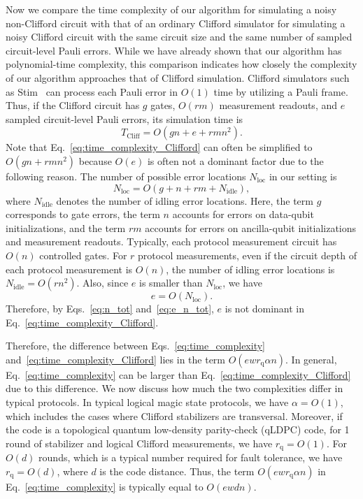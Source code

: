 \documentclass[
 reprint,
 amsmath,amssymb,
 pra,superscriptaddress, nofootinbib
]{revtex4-2}
\theoremstyle{definition}
\theoremstyle{plain}
\begin{document}
Now we compare the time complexity of our algorithm for simulating a noisy non-Clifford circuit with that of an ordinary Clifford simulator for simulating a noisy Clifford circuit with the same circuit size and the same number of sampled circuit-level Pauli errors.
While we have already shown that our algorithm has polynomial-time complexity, this comparison indicates how closely the complexity of our algorithm approaches that of Clifford simulation.
Clifford simulators such as Stim~\cite{Gidney2021stimfaststabilizer} can process each Pauli error in $O(1)$ time by utilizing a Pauli frame.
Thus, if the Clifford circuit has $g$ gates, $O(rm)$ measurement readouts, and $e$ sampled circuit-level Pauli errors, its simulation time is
\begin{equation}
    T_{\mathrm{Cliff}}=O\!\left(gn+e+rmn^2\right).
    \label{eq:time_complexity_Clifford}
\end{equation}
Note that Eq.~\eqref{eq:time_complexity_Clifford} can often be simplified to $O\!\left(gn+rmn^2\right)$ because $O(e)$ is often not a dominant factor due to the following reason.
The number of possible error locations $N_{\mathrm{loc}}$ in our setting is
\begin{equation}
  N_{\mathrm{loc}}=O(g+n+rm+N_{\mathrm{idle}}),
  \label{eq:n_tot}
\end{equation}
where $N_{\mathrm{idle}}$ denotes the number of idling error locations.
Here, the term $g$ corresponds to gate errors, the term $n$ accounts for errors on data-qubit initializations, and the term $rm$ accounts for errors on ancilla-qubit initializations and measurement readouts. 
Typically, each protocol measurement circuit has $O(n)$ controlled gates.
For $r$ protocol measurements, even if the circuit depth of each protocol measurement is $O(n)$, the number of idling error locations is $N_{\mathrm{idle}}=O(rn^2)$. 
Also, since $e$ is smaller than $N_{\mathrm{loc}}$, we have
\begin{equation}
  e=O(N_{\mathrm{loc}}).
  \label{eq:e_n_tot}
\end{equation}
Therefore, by Eqs.~\eqref{eq:n_tot} and~\eqref{eq:e_n_tot}, $e$ is not dominant in Eq.~\eqref{eq:time_complexity_Clifford}.

Therefore, the difference between Eqs.~\eqref{eq:time_complexity} and~\eqref{eq:time_complexity_Clifford} lies in the term $O(ewr_\mathrm{q}\alpha n)$. 
In general, Eq.~\eqref{eq:time_complexity} can be larger than Eq.~\eqref{eq:time_complexity_Clifford} due to this difference. We now discuss how much the two complexities differ in typical protocols. 
In typical logical magic state protocols, we have $\alpha=O(1)$, which includes the cases where Clifford stabilizers are transversal. 
Moreover, if the code is a topological quantum low-density parity-check (qLDPC) code, for 1 round of stabilizer and logical Clifford measurements, we have $r_\mathrm{q}=O(1)$. For $O(d)$ rounds, which is a typical number required for fault tolerance, we have $r_\mathrm{q}=O(d)$, where $d$ is the code distance. 
Thus, the term $O(ewr_\mathrm{q}\alpha n)$ in Eq.~\eqref{eq:time_complexity} is typically equal to $O(ewdn)$.
\end{document}

